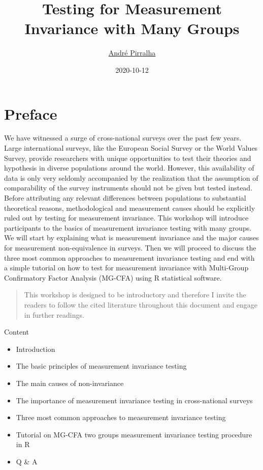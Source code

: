 \documentclass[
]{book}
\title{Testing for Measurement Invariance with Many Groups}
\author{\href{https://www.andrepirralha.com}{André Pirralha}}
\date{2020-10-12}
\providecommand{\tightlist}{%
  \setlength{\itemsep}{0pt}\setlength{\parskip}{0pt}}
\begin{document}
\maketitle

{
\setcounter{tocdepth}{1}
\tableofcontents
}
\hypertarget{preface}{%
\chapter{Preface}\label{preface}}

We have witnessed a surge of cross-national surveys over the past few years. Large international surveys, like the European Social Survey or the World Values Survey, provide researchers with unique opportunities to test their theories and hypothesis in diverse populations around the world. However, this availability of data is only very seldomly accompanied by the realization that the assumption of comparability of the survey instruments should not be given but tested instead. Before attributing any relevant differences between populations to substantial theoretical reasons, methodological and measurement causes should be explicitly ruled out by testing for measurement invariance. This workshop will introduce participants to the basics of measurement invariance testing with many groups. We will start by explaining what is measurement invariance and the major causes for measurement non-equivalence in surveys. Then we will proceed to discuss the three most common approaches to measurement invariance testing and end with a simple tutorial on how to test for measurement invariance with Multi-Group Confirmatory Factor Analysis (MG-CFA) using R statistical software.

\begin{quote}
This workshop is designed to be introductory and therefore I invite the readers to follow the cited literature throughout this document and engage in further readings.
\end{quote}

Content

\begin{itemize}
\tightlist
\item
  Introduction\\
\item
  The basic principles of measurement invariance testing
\item
  The main causes of non-invariance
\item
  The importance of measurement invariance testing in cross-national surveys
\item
  Three most common approaches to measurement invariance testing
\item
  Tutorial on MG-CFA two groups measurement invariance testing procedure in R
\item
  Q \& A
\end{itemize}
\end{document}
